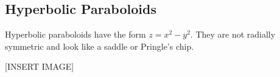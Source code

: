 \subsection{Hyperbolic Paraboloids}
\noindent
Hyperbolic paraboloids have the form $z = x^2 - y^2$. They are not radially symmetric and look like a saddle or Pringle's chip.

[INSERT IMAGE]
